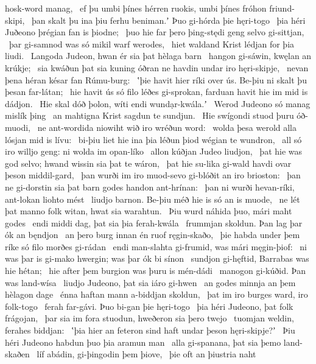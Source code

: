 hosk-word manag, \hld\ ef þu umbi þínes hérren ruokis,
umbi þínes fróhon friund-skipi, \hld\ þan skalt þu ina þiu ferhu beniman.ʼ
Þuo gi-hórda þie hęri-togo \hld\ þia héri Juðeono
þrégian fan is þiodne; \hld\ þuo hie far þero þing-stędi geng
selvo gi-sittjan, \hld\ þar gi-samnod was
só mikil warf werodes, \hld\ hiet waldand Krist
lédjan for þia liudi. \hld\ Langoda Judeon,
hwan ér sia þat hèlaga barn \hld\ hangon gi-sáwin,
kwęlan an krúkje; \hld\ sia kwáðun þat sia kuning óðran
ne havdin undar iro hęri-skipje, \hld\ nevan þena héran késar
fan Rúmu-burg: \hld\ ʽþie havit hier ríki over ús.
Be-þiu ni skalt þu þesan far-látan; \hld\ hie havit ús só filo léðes gi-sprokan,
farduan havit hie im mid is dádjon. \hld\ Hie skal dóð þolon,
wíti endi wundạr-kwála.ʼ \hld\ Werod Judeono
só manag mislík þing \hld\ an mahtigna Krist
sagdun te sundjun. \hld\ Hie swígondi stuod
þuru óð-muodi, \hld\ ne ant-wordida niowiht
wið iro wréðun word: \hld\ wolda þesa werold alla
lósjan mid is lívu: \hld\ bi-þiu liet hie ina þia léðun þiod
wégian te wundron, \hld\ all só iro willjo geng:
ni wolda im opan-líko \hld\ allon kúðjan
Judeo liudjon, \hld\ þat hie was god selvo;
hwand wissin sia þat te wáron, \hld\ þat hie su-lika gi-wald havdi
ovar þeson middil-gard, \hld\ þan wurði im iro muod-sevo
gi-blóðit an iro brioston: \hld\ þan ne gi-dorstin sia þat barn godes
handon ant-hrínan: \hld\ þan ni wurði hevan-ríki,
ant-lokan liohto mést \hld\ liudjo barnon.
Be-þiu méð hie is só an is muode, \hld\ ne lét þat manno folk
witan, hwat sia warahtun. \hld\ Þiu wurd náhida þuo,
mári maht godes \hld\ endi middi dag,
þat sia þia ferah-kwála \hld\ frummjan skoldun.
Þan lag þar ók an bęndjon \hld\ an þero burg innan
én ruof ręgin-skaðo, \hld\ þie habda under þem ríke só filo
morðes gi-rádan \hld\ endi man-slahta gi-frumid,
was mári męgin-þiof: \hld\ ni was þar is gi-mako hwergin;
was þar ók bi sínon \hld\ sundjon gi-hęftid,
Barrabas was hie hétan; \hld\ hie after þem burgion was
þuru is mén-dádi \hld\ manogon gi-kúðid.
Þan was land-wísa \hld\ liudjo Judeono,
þat sia iáro gi-hwen \hld\ an godes minnja
an þem hèlagon dage \hld\ énna haftan mann
a-biddjan skoldun, \hld\ þat im iro burges ward,
iro folk-togo \hld\ ferah far-gávi.
Þuo bi-gan þie hęri-togo \hld\ þia héri Judeono,
þat folk frágojan, \hld\ þar sia im fora stuodun,
hweðeron sia þero twejo \hld\ tuomjan weldin,
ferahes biddjan: \hld\ ʽþia hier an feteron sind
haft undar þeson hęri-skipje?ʼ \hld\ Þiu héri Judeono
habdun þuo þia aramun man \hld\ alla gi-spanana,
þat sia þemo land-skaðen \hld\ líf abádin,
gi-þingodin þem þiove, \hld\ þie oft an þiustria naht
